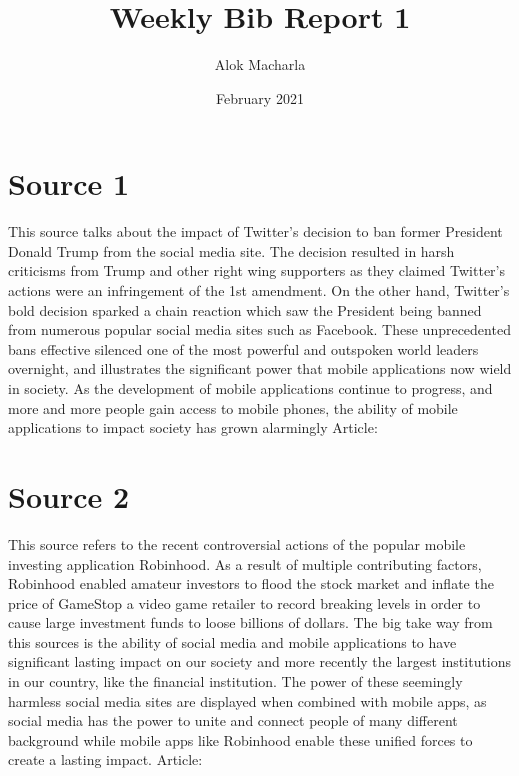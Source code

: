 \documentclass{article}
\title{Weekly Bib Report 1}
\author{Alok Macharla }
\date{February 2021}
\begin{document}
\maketitle

\section{Source 1}
This source talks about the impact of Twitter's decision to ban former President Donald Trump from the social media site. The decision resulted in harsh criticisms from Trump and other right wing supporters as they claimed Twitter's actions were an infringement of the 1st amendment. On the other hand, Twitter's bold decision sparked a chain reaction which saw the President being banned from numerous popular social media sites such as Facebook. These unprecedented bans effective silenced one of the most powerful and outspoken world leaders overnight, and  illustrates the significant power that mobile applications now wield in society. As the development of mobile applications continue to progress, and more and more people gain access to mobile phones, the ability of mobile applications to impact society has grown alarmingly
Article: \cite{edsgcl.64787209220210109}

\section{Source 2}
This source refers to the recent controversial actions of the popular mobile investing application Robinhood. As a result of multiple contributing factors, Robinhood enabled amateur investors to flood the stock market and inflate the price of GameStop a video game retailer to record breaking levels in order to cause large investment funds to loose billions of dollars. The big take way from this sources is the ability of social media and mobile applications to have significant lasting impact on our society and more recently the largest institutions in our country, like the financial institution. The power of these seemingly harmless social media sites are displayed when combined with mobile apps, as social media has the power to unite and connect people of many different background while mobile apps like Robinhood enable these unified forces to create a lasting impact. 
Article: \cite{edsgcl.64530890420200101}



\end{document}
